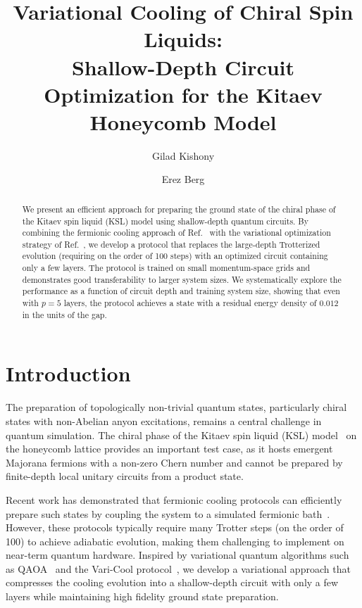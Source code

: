 \documentclass[twocolumn,
aps,
prx,
showpacs,
amsmath,
amssymb,
floatfix,
longbibliography,
superscriptaddress,
eprint]
{revtex4-1}
\begin{document}
\title{Variational Cooling of Chiral Spin Liquids: \\ Shallow-Depth Circuit Optimization for the Kitaev Honeycomb Model}

\author{Gilad Kishony}
\author{Erez Berg}

\begin{abstract}
We present an efficient approach for preparing the ground state of the chiral phase of the Kitaev spin liquid (KSL) model using shallow-depth quantum circuits. By combining the fermionic cooling approach of Ref.~\cite{Kishony_2025} with the variational optimization strategy of Ref.~\cite{song2025varicoolnonunitaryquantumvariational}, we develop a protocol that replaces the large-depth Trotterized evolution (requiring on the order of 100 steps) with an optimized circuit containing only a few layers. The protocol is trained on small momentum-space grids and demonstrates good transferability to larger system sizes. We systematically explore the performance as a function of circuit depth and training system size, showing that even with $p=5$ layers, the protocol achieves a state with a residual energy density of $0.012$ in the units of the gap.
\end{abstract}

\maketitle

\section{Introduction}

The preparation of topologically non-trivial quantum states, particularly chiral states with non-Abelian anyon excitations, remains a central challenge in quantum simulation. The chiral phase of the Kitaev spin liquid (KSL) model~\cite{kitaev2006anyons} on the honeycomb lattice provides an important test case, as it hosts emergent Majorana fermions with a non-zero Chern number and cannot be prepared by finite-depth local unitary circuits from a product state.

Recent work has demonstrated that fermionic cooling protocols can efficiently prepare such states by coupling the system to a simulated fermionic bath~\cite{Kishony_2025}. However, these protocols typically require many Trotter steps (on the order of 100) to achieve adiabatic evolution, making them challenging to implement on near-term quantum hardware. Inspired by variational quantum algorithms such as QAOA~\cite{farhiQAOA} and the Vari-Cool protocol~\cite{Kishony_2025}, we develop a variational approach that compresses the cooling evolution into a shallow-depth circuit with only a few layers while maintaining high fidelity ground state preparation.
\end{document}
